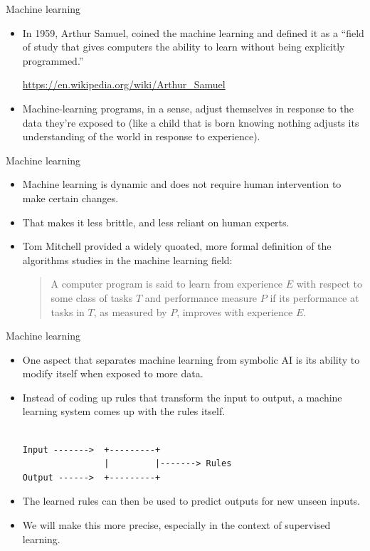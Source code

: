 \documentclass{beamer}
\begin{document}
\begin{frame}{Machine learning}
\begin{itemize}
\item In 1959, Arthur Samuel, coined the machine learning and defined it as a ``field of study that gives computers the ability to learn without being explicitly programmed.''

\url{https://en.wikipedia.org/wiki/Arthur_Samuel}

\item Machine-learning programs, in a sense, adjust themselves in response to the data they’re exposed to (like a child that is born knowing nothing adjusts its understanding of the world in response to experience).
\end{itemize}
\end{frame}

\begin{frame}{Machine learning}

\begin{itemize}
\item Machine learning is dynamic and does not require human intervention to make certain changes. 

\item That makes it less brittle, and less reliant on human experts.

\item Tom Mitchell provided a widely quoated, more formal definition of the algorithms studies in the machine learning field:

\medskip
\begin{quote}
A computer program is said to learn from experience $E$ with respect to some class of tasks $T$ and performance measure $P$ if its performance at tasks in $T$, as measured by $P$, improves with experience $E$.
\end{quote}
\end{itemize}

\end{frame}

\begin{frame}[fragile]{Machine learning}
\begin{itemize}
\item One aspect that separates machine learning from symbolic AI is its ability to modify itself when exposed to more data.

\item Instead of coding up rules that transform the input to output, a machine learning system comes up with the rules itself.

\begin{verbatim}

Input ------->  +---------+
                |         |-------> Rules
Output ------>  +---------+

\end{verbatim}
\item The learned rules can then be used to predict outputs for new unseen inputs.

\item We will make this more precise, especially in the context of supervised learning.
\end{itemize}
\end{frame}
\end{document}
